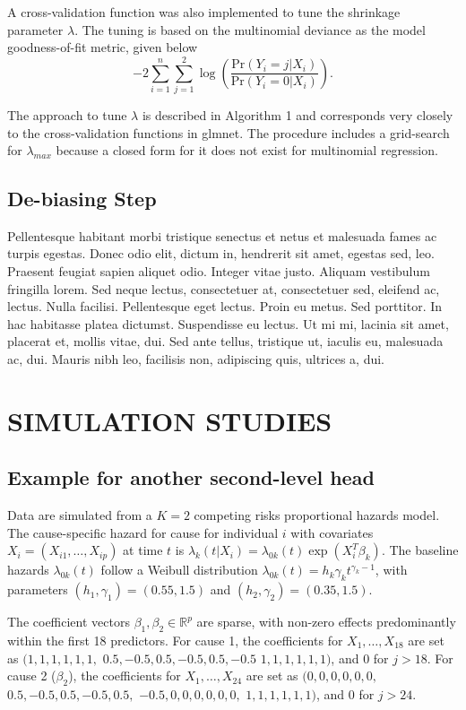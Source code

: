 \documentclass[AMA,Times1COL]{WileyNJDv5} %
\begin{document}
A cross-validation function was also implemented to tune the shrinkage parameter $\lambda$. The tuning is based on the multinomial deviance as the model goodness-of-fit metric, given below $$-2\sum_{i=1}^{n}\sum_{j=1}^{2}\log(\frac{\text{Pr}(Y_{i}=j|X_{i})}{\text{Pr}(Y_{i}=0|X_{i})}).$$

The approach to tune $\lambda$ is described in Algorithm 1 and corresponds very closely to the cross-validation functions in glmnet. The procedure includes a grid-search for $\lambda_{max}$ because a closed form for it does not exist for multinomial regression.

\subsection{De-biasing Step}

Pellentesque habitant morbi tristique senectus et netus et malesuada fames ac turpis egestas. Donec odio elit, dictum
in, hendrerit sit amet, egestas sed, leo. Praesent feugiat sapien aliquet odio. Integer vitae justo. Aliquam vestibulum
fringilla lorem. Sed neque lectus, consectetuer at, consectetuer sed, eleifend ac, lectus. Nulla facilisi. Pellentesque
eget lectus. Proin eu metus. Sed porttitor. In hac habitasse platea dictumst. Suspendisse eu lectus. Ut mi mi, lacinia
sit amet, placerat et, mollis vitae, dui. Sed ante tellus, tristique ut, iaculis eu, malesuada ac, dui. Mauris nibh leo,
facilisis non, adipiscing quis, ultrices a, dui.


\section{SIMULATION STUDIES}\label{sec3}

\subsection{Example for another second-level head}

Data are simulated from a $K=2$ competing risks proportional hazards model. The cause-specific hazard for cause for individual $i$ with covariates $X_i = (X_{i1}, \dots, X_{ip})$ at time $t$ is $\lambda_k(t | X_i) = \lambda_{0k}(t) \exp(X_i^T \beta_k)$. The baseline hazards $\lambda_{0k}(t)$ follow a Weibull distribution $\lambda_{0k}(t) = h_k \gamma_k t^{\gamma_k - 1}$, with parameters $(h_1, \gamma_1)=(0.55, 1.5)$ and $(h_2, \gamma_2)=(0.35, 1.5)$.

The coefficient vectors $\beta_1, \beta_2 \in \mathbb{R}^p$ are sparse, with non-zero effects predominantly within the first 18 predictors. For cause 1, the coefficients for $X_1, \dots, X_{18}$ are set as $(1, 1, 1, 1, 1, 1,$ $0.5, -0.5, 0.5, -0.5, 0.5, -0.5$ $1, 1, 1, 1, 1, 1)$, and 0 for $j > 18$. For cause 2 ($\beta_2$), the coefficients for $X_1, \dots, X_{24}$ are set as $(0, 0, 0, 0, 0, 0,$ $0.5, -0.5, 0.5, -0.5, 0.5,$ $-0.5, 0, 0, 0, 0, 0, 0,$ $1, 1, 1, 1, 1, 1)$, and 0 for $j > 24$.
\end{document}
